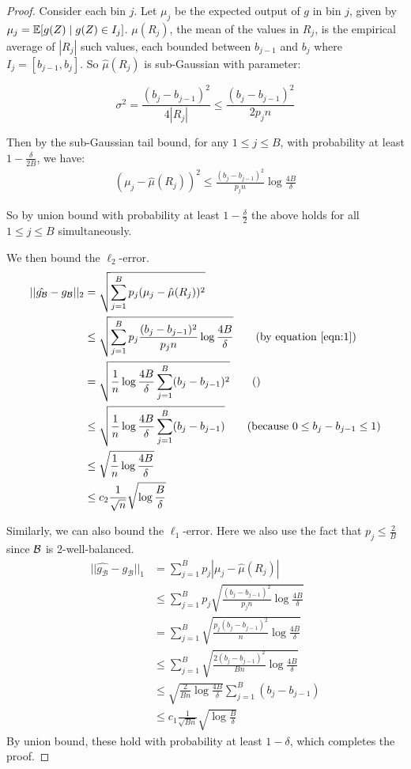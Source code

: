 \begin{proof}
Consider each bin $j$. Let $\mu_j$ be the expected output of $g$ in bin $j$, given by $\mu_j = \mathbb{E}[g(Z) \; | \; g(Z) \in I_j]$. $\mu(R_j)$, the mean of the values in $R_j$, is the empirical average of $|R_j|$ such values, each bounded between $b_{j-1}$ and $b_j$ where $I_j = [b_{j-1}, b_j]$. So $\hat{\mu}(R_j)$ is sub-Gaussian with parameter:

\[ \sigma^2 = \frac{(b_j - b_{j-1})^2}{4|R_j|} \leq \frac{(b_j - b_{j-1})^2}{2p_jn} \]

Then by the sub-Gaussian tail bound, for any $1 \leq j \leq B$, with probability at least $1 - \frac{\delta}{2B}$, we have:
\begin{align} (\mu_j - \hat{\mu}(R_j))^2 \leq \frac{(b_j - b_{j-1})^2}{p_jn} \log{\frac{4B}{\delta}}\label{eqn:1} \end{align}

So by union bound with probability at least $1 - \frac{\delta}{2}$ the above holds for all $1 \leq j \leq B$ simultaneously.

We then bound the $\ell_2$-error.
\begin{align*}
||\hat{g_{\mathcal{B}}} - g_{\mathcal{B}}||_2 &= \sqrt{\sum_{j =1}^B p_j (\mu_j - \hat{\mu}(R_j))^2} \\
&\leq \sqrt{\sum_{j =1}^B p_j \frac{(b_j - b_{j-1})^2}{p_jn} \log{\frac{4B}{\delta}}} \tag{by equation~\eqref{eqn:1}}\\
&= \sqrt{\frac{1}{n} \log{\frac{4B}{\delta}} \sum_{j =1}^B (b_j - b_{j-1})^2 } \tag{\tnote{this is an equality?}} \\
&\leq \sqrt{\frac{1}{n} \log{\frac{4B}{\delta}} \sum_{j =1}^B (b_j - b_{j-1}) } \tag{because $0\le b_j - b_{j-1}\le 1$}\\
&\leq \sqrt{\frac{1}{n} \log{\frac{4B}{\delta}} } \\
&\leq c_2 \frac{1}{\sqrt{n}} \sqrt{\log{\frac{B}{\delta}}}
\end{align*}

Similarly, we can also bound the $\ell_1$-error. Here we also use the fact that $p_j \leq \frac{2}{B}$ since $\mathcal{B}{}$ is 2-well-balanced.
\begin{align*}
||\hat{g_{\mathcal{B}}} - g_{\mathcal{B}}||_1 &= \sum_{j =1}^B p_j |\mu_j - \hat{\mu}(R_j)| \\
&\leq \sum_{j =1}^B p_j \sqrt{\frac{(b_j - b_{j-1})^2}{p_jn} \log{\frac{4B}{\delta}}} \\
&=\sum_{j =1}^B \sqrt{\frac{p_j(b_j - b_{j-1})^2}{n} \log{\frac{4B}{\delta}}} \\
&\leq \sum_{j =1}^B \sqrt{\frac{2(b_j - b_{j-1})^2}{Bn} \log{\frac{4B}{\delta}}} \\
&\leq \sqrt{\frac{2}{Bn} \log{\frac{4B}{\delta}}} \sum_{j =1}^B (b_j - b_{j-1}) \\
&\leq c_1 \frac{1}{\sqrt{Bn}} \sqrt{\log{\frac{B}{\delta}}}
\end{align*}
By union bound, these hold with probability at least $1 - \delta$, which completes the proof.
\end{proof}

